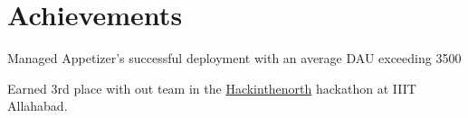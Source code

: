 \documentclass[letterpaper]{deedy-resume} %
\begin{document}
\begin{minipage}[t]{0.66\textwidth}





\section{Achievements} 
\begin{tightitemize}
\sectionspace %
\item Managed Appetizer's successful deployment with an average DAU exceeding 3500
\item Earned 3rd place with out team in the \href{https://www.hackinthenorth.com/}{Hackinthenorth} hackathon at IIIT Allahabad. 


\end{tightitemize}



\end{minipage} %

\end{document}

